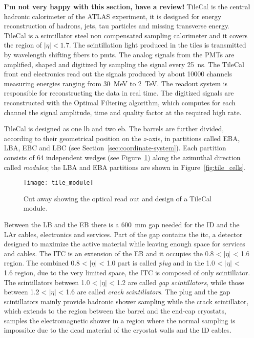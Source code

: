 \textbf{I'm not very happy with this section, have a review!}
TileCal is the central hadronic calorimeter of the ATLAS experiment, it is
designed for energy reconstruction of hadrons, jets, tau particles and missing
transverse energy. TileCal is a scintillator steel non compensated sampling
calorimeter and it covers the region of $|\eta| < 1.7$. The scintillation light
produced in the tiles is transmitted by wavelength shifting fibers to
\glspl{pmt}. The analog signals from the PMTs are amplified, shaped and
digitized by sampling the signal every 25~ns. The TileCal front end electronics
read out the signals produced by about 10000 channels measuring energies ranging
from 30~MeV to 2~TeV. The readout system is responsible for reconstructing the
data in real time. The digitized signals are reconstructed with the Optimal
Filtering algorithm, which computes for each channel the signal amplitude, time
and quality factor at the required high rate.

TileCal is designed as one \gls{lb} and two \gls{eb}. The barrels are further
divided, according to their geometrical position on the $z$-axis, in partitions
called EBA, LBA, EBC and LBC (see Section~\ref{sec:coordinate-system}). Each
partition consists of 64 independent wedges (see Figure~\ref{fig:tile_mod})
along the azimuthal direction called \emph{modules}; the LBA and EBA partitions
are shown in Figure~\ref{fig:tile_cells}.

\begin{figure}[!h]
  \centering
    \texttt{[image: tile\_module]}
    \caption{Cut away showing the optical read out and design of a TileCal
      module.}
    \label{fig:tile_mod}
\end{figure}

Between the LB and the EB there is a 600~mm gap needed for the ID and the LAr
cables, electronics and services. Part of the gap contains the \gls{itc}, a
detector designed to maximize the active material while leaving enough space for
services and cables. The ITC is an extension of the EB and it occupies the 0.8 <
$|\eta|$ < 1.6 region. The combined 0.8 < $|\eta|$ < 1.0 part is called
\emph{plug} and in the 1.0 < $|\eta|$ < 1.6 region, due to the very limited
space, the ITC is composed of only scintillator. The scintillators between 1.0 <
$|\eta|$ < 1.2 are called \emph{gap scintillators}, while those between 1.2 <
$|\eta|$ < 1.6 are called \emph{crack scintillators}. The plug and the gap
scintillators mainly provide hadronic shower sampling while the crack
scintillator, which extends to the region between the barrel and the end-cap
cryostats, samples the electromagnetic shower in a region where the normal
sampling is impossible due to the dead material of the cryostat walls and the ID
cables.

